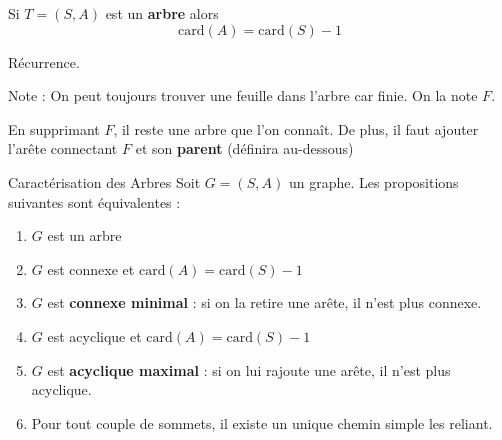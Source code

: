 \begin{Prop}{}{}
Si $T = (S,A)$ est un \textbf{arbre} alors \[
\mathrm{card} (A) = \mathrm{card} (S) - 1
\]
\end{Prop}

\begin{myproof}{}{}
  Récurrence. 

  Note : On peut toujours trouver une feuille dans l'arbre car finie. On la note $F$. 

  En supprimant $F$, il reste une arbre que l'on connaît. De plus, il faut ajouter l'arête connectant $F$ et son \textbf{parent} (définira au-dessous)
\end{myproof}





\begin{Theorem}{Caractérisation des Arbres}{}
Soit $G=(S,A)$ un graphe. Les propositions suivantes sont équivalentes : 
\begin{enumerate}
  \item $G$ est un arbre 
  \item $G$ est connexe et $\mathrm{card}(A) = \mathrm{card}(S)-1$ 
  \item $G$ est \textbf{connexe minimal}  : si on la retire une arête, il n'est plus connexe. 
  \item $G$ est acyclique et $\mathrm{card}(A) = \mathrm{card}  (S)-1$    
  \item $G$ est \textbf{acyclique maximal} : si on lui rajoute une arête, il n'est plus acyclique. 
  \item Pour tout couple de sommets, il existe un unique chemin simple les reliant.
\end{enumerate}
\end{Theorem}

